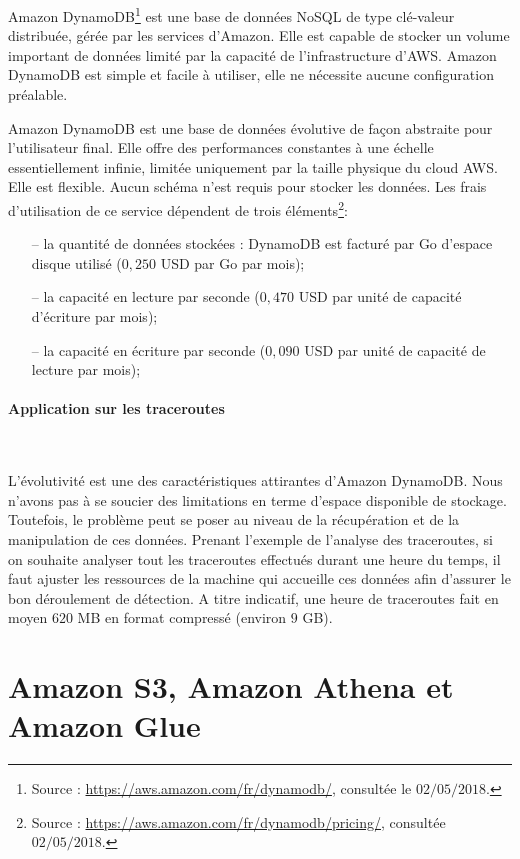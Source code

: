 Amazon DynamoDB\footnote{Source : \url{https://aws.amazon.com/fr/dynamodb/}, consultée le $02/05/2018$.} est une base de données NoSQL de type clé-valeur distribuée, gérée par les services d'Amazon. Elle est capable de stocker un volume important de données limité par la capacité de l'infrastructure d'AWS. Amazon DynamoDB   est simple et facile à utiliser,  elle ne nécessite aucune configuration préalable. 

Amazon DynamoDB  est une base de données évolutive de façon abstraite pour l'utilisateur final. Elle offre des performances constantes à une échelle essentiellement infinie, limitée uniquement par la taille physique du cloud AWS. Elle est flexible. Aucun schéma n'est requis pour stocker les données. Les frais d'utilisation de ce service dépendent de trois éléments\footnote{Source : \url{https://aws.amazon.com/fr/dynamodb/pricing/}, consultée $02/05/2018$.}:
\begin{itemize}
	\item[--] la quantité de données stockées : DynamoDB est facturé par Go d'espace disque utilisé ($ 0,250 $ USD par Go par mois);
	\item[--] la capacité en lecture par seconde ($ 0,470 $ USD par unité de capacité d'écriture par mois);
	\item[--]  la capacité en écriture par seconde ($ 0,090 $ USD par unité de capacité de lecture par mois);
\end{itemize}


\paragraph{Application sur les traceroutes}~


L'évolutivité est une des caractéristiques attirantes d'Amazon DynamoDB. Nous n'avons pas à se soucier des limitations en terme d'espace disponible de stockage. Toutefois, le problème peut se poser au niveau de la récupération et de la manipulation de ces données. Prenant l'exemple de l'analyse des traceroutes, si on souhaite analyser tout les traceroutes effectués durant une heure du temps, il faut ajuster les ressources de la machine qui accueille ces données afin d'assurer le bon déroulement de détection. A titre indicatif, une heure de traceroutes fait en moyen $620$ MB en format compressé (environ $9$ GB).




\section{Amazon S3, Amazon Athena et Amazon Glue }

